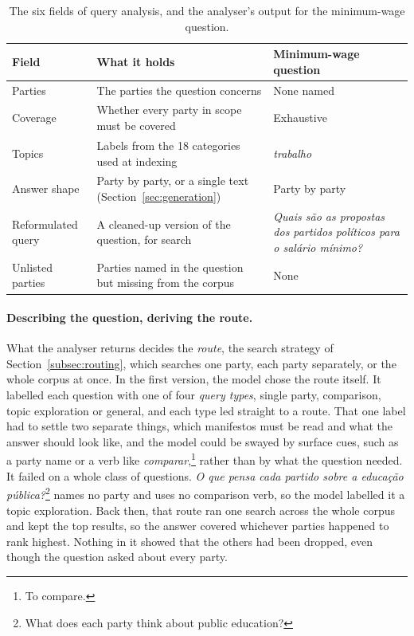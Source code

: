 \begin{table}[htbp]
    \centering
    \small
    \begin{tabular}{|l|>{\raggedright\arraybackslash}p{}|>{\raggedright\arraybackslash}p{}|}
        \hline
        \textbf{Field} & \textbf{What it holds} & \textbf{Minimum-wage question} \\
        \hline
        Parties & The parties the question concerns & None named \\
        Coverage & Whether every party in scope must be covered & Exhaustive \\
        Topics & Labels from the 18 categories used at indexing & \textit{trabalho} \\
        Answer shape & Party by party, or a single text (Section~\ref{sec:generation}) & Party by party \\
        Reformulated query & A cleaned-up version of the question, for search & \textit{Quais são as propostas dos partidos políticos para o salário mínimo?} \\
        Unlisted parties & Parties named in the question but missing from the corpus & None \\
        \hline
    \end{tabular}
    \caption[Query analysis]{The six fields of query analysis, and the
    analyser's output for the minimum-wage question.}
    \label{tab:analysis}
\end{table}

\paragraph{Describing the question, deriving the route.} What the analyser
returns decides the \emph{route}, the search strategy of
Section~\ref{subsec:routing}, which searches one party, each party
separately, or the whole corpus at once. In the first version, the model chose
the route itself. It labelled each question with one of four \emph{query
types}, single party, comparison, topic exploration or general, and each type
led straight to a route. That one label had to settle two separate things,
which manifestos must be read and what the answer should look like, and the
model could be swayed by surface cues, such as a party name or a verb like
\textit{comparar},\footnote{To compare.} rather than by what the question needed. It failed on a
whole class of questions. \textit{O que pensa cada partido sobre a educação
pública?}\footnote{What does each party think about public education?} names
no party and uses no comparison verb, so the model labelled it a topic
exploration. Back then, that route ran one search across the whole corpus and
kept the top results, so the answer covered whichever parties happened to rank
highest. Nothing in it showed that the others had been dropped, even though
the question asked about every party.

